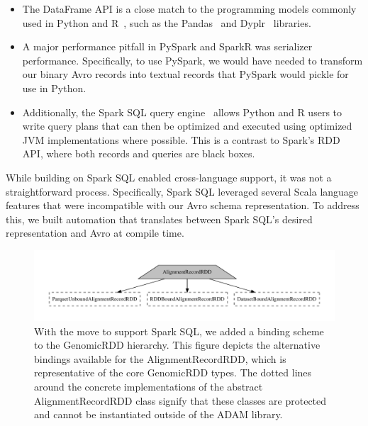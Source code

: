 \documentclass[phd]{ucbthesis}
\begin{document}
\begin{itemize}
\item The {DataFrame} API is a close match to the programming models
  commonly used in {Python} and R~\cite{armbrust15}, such as the
  {Pandas}~\cite{mckinney10} and {Dyplr}~\cite{wickham15} libraries.
\item A major performance pitfall in {PySpark} and {SparkR} was
  serializer performance. Specifically, to use {PySpark}, we would have
  needed to transform our binary {Avro} records into textual records that
  {PySpark} would pickle for use in {Python}.
\item Additionally, the {Spark SQL} query engine~\cite{armbrust15} allows
  {Python} and R users to write query plans that can then be optimized
  and executed using optimized JVM implementations where possible. This is a
  contrast to {Spark}'s RDD API, where both records and queries are black
  boxes.
\end{itemize}

While building on {Spark SQL} enabled cross-language support, it was not
a straightforward process. Specifically, {Spark SQL} leveraged several
{Scala} language features that were incompatible with our {Avro}
schema representation. To address this, we built automation that translates
between {Spark SQL}'s desired representation and {Avro} at compile
time.

\begin{figure}[h]
\begin{center}
\includegraphics[width=0.8\linewidth]{graphs/binding.pdf}
\end{center}
\caption{With the move to support {Spark SQL}, we added a binding scheme
  to the {GenomicRDD} hierarchy. This figure depicts the alternative
  bindings available for the {AlignmentRecordRDD}, which is
  representative of the core {GenomicRDD} types. The dotted lines around
  the concrete implementations of the abstract {AlignmentRecordRDD} class
  signify that these classes are protected and cannot be instantiated outside of
  the {ADAM} library.}
\label{fig:binding}
\end{figure}
\end{document}
